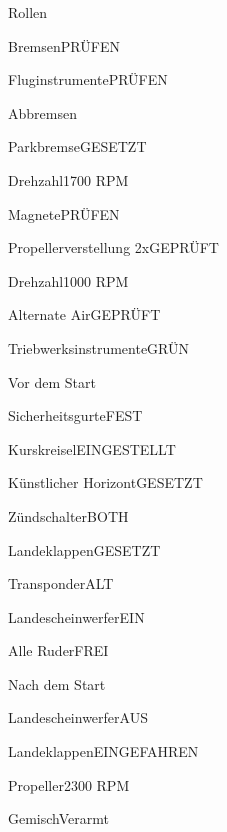 \begin{memoryitem}
  \begin{checklist}{Rollen}
    \item{Bremsen}{PRÜFEN}
    \item{Fluginstrumente}{PRÜFEN}
  \end{checklist}
\end{memoryitem}

\begin{memoryitem}
  \begin{checklist}{Abbremsen}
    \item{Parkbremse}{GESETZT}
    \item{Drehzahl}{1700 RPM}
    \item{Magnete}{PRÜFEN}
    \item{Propellerverstellung 2x}{GEPRÜFT}
    \item{Drehzahl}{1000 RPM}
    \item{Alternate Air}{GEPRÜFT}
    \item{Triebwerksinstrumente}{GRÜN}
  \end{checklist}
\end{memoryitem}

\begin{memoryitem}
  \begin{checklist}{Vor dem Start}
    \item{Sicherheitsgurte}{FEST}
    \item{Kurskreisel}{EINGESTELLT}
    \item{Künstlicher Horizont}{GESETZT}
    \item{Zündschalter}{BOTH}
    \item{Landeklappen}{GESETZT}
    \item{Transponder}{ALT}
    \item{Landescheinwerfer}{EIN}
    \item{Alle Ruder}{FREI}
  \end{checklist}
\end{memoryitem}

\begin{memoryitem}
  \begin{checklist}{Nach dem Start}
    \item{Landescheinwerfer}{AUS}
    \item{Landeklappen}{EINGEFAHREN}
    \item{Propeller}{2300 RPM}
    \item{Gemisch}{Verarmt}
  \end{checklist}
\end{memoryitem}

